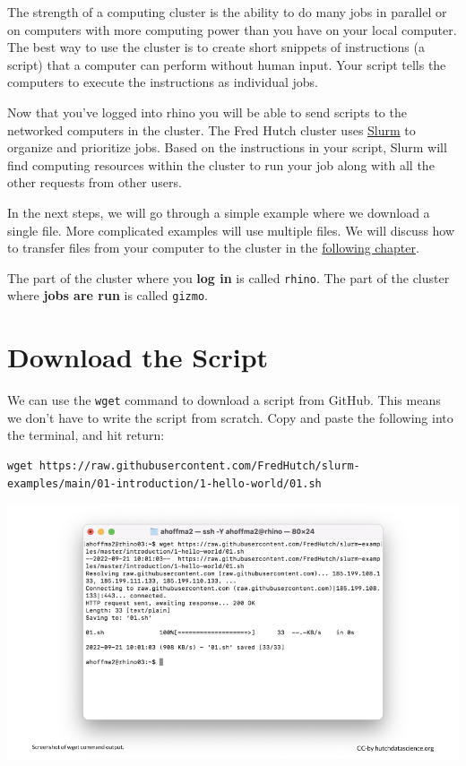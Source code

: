 \documentclass[
]{book}
\begin{document}
The strength of a computing cluster is the ability to do many jobs in parallel or on computers with more computing power than you have on your local computer. The best way to use the cluster is to create short snippets of instructions (a script) that a computer can perform without human input. Your script tells the computers to execute the instructions as individual jobs.

Now that you've logged into rhino you will be able to send scripts to the networked computers in the cluster. The Fred Hutch cluster uses \href{https://slurm.schedmd.com/overview.html}{Slurm} to organize and prioritize jobs. Based on the instructions in your script, Slurm will find computing resources within the cluster to run your job along with all the other requests from other users.

In the next steps, we will go through a simple example where we download a single file. More complicated examples will use multiple files. We will discuss how to transfer files from your computer to the cluster in the \protect\hyperlink{file-upload-and-download}{following chapter}.

The part of the cluster where you \textbf{log in} is called \texttt{rhino}.
The part of the cluster where \textbf{jobs are run} is called \texttt{gizmo}.

\hypertarget{download-the-script}{%
\section{Download the Script}\label{download-the-script}}

We can use the \texttt{wget} command to download a script from GitHub. This means we don't have to write the script from scratch. Copy and paste the following into the terminal, and hit return:

\begin{verbatim}
wget https://raw.githubusercontent.com/FredHutch/slurm-examples/main/01-introduction/1-hello-world/01.sh
\end{verbatim}

\includegraphics[width=1\linewidth]{resources/images/06-first-job_files/figure-latex//1BQxrVYdKZTbpCaF-i_q9w7s9x034lEXpQZDU-Sl09cs_g1579ffd7b01_0_0}
\end{document}

